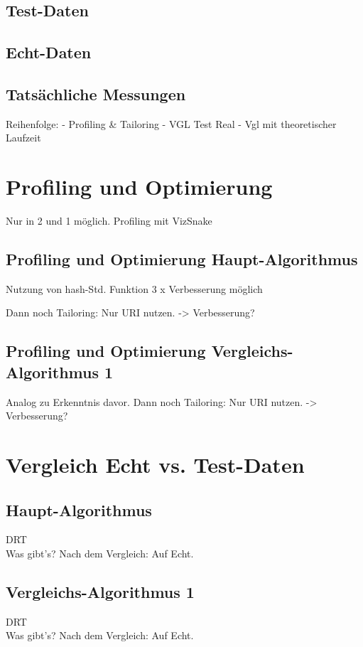 \documentclass[
10pt, %
a4paper, %
oneside, %
headinclude,footinclude, %
BCOR5mm, %
]{scrartcl}
\begin{document}
\subsection{Test-Daten}
\subsection{Echt-Daten}
\subsection{Tatsächliche Messungen}
Reihenfolge:
- Profiling \& Tailoring
- VGL Test Real
- Vgl mit theoretischer Laufzeit

\section{Profiling und Optimierung}

Nur in 2 und 1 möglich.
Profiling mit VizSnake
\subsection{Profiling und Optimierung Haupt-Algorithmus}

Nutzung von hash-Std. Funktion
3 x Verbesserung möglich

Dann noch Tailoring: Nur URI nutzen.
-> Verbesserung?

\subsection{Profiling und Optimierung Vergleichs-Algorithmus 1}
Analog zu Erkenntnis davor.
Dann noch Tailoring: Nur URI nutzen.
-> Verbesserung?

\section{Vergleich Echt vs. Test-Daten}
\subsection{Haupt-Algorithmus}
DRT\\
Was gibt's?
Nach dem Vergleich: Auf Echt.

\subsection{Vergleichs-Algorithmus 1}
DRT\\
Was gibt's?
Nach dem Vergleich: Auf Echt.
\end{document}
